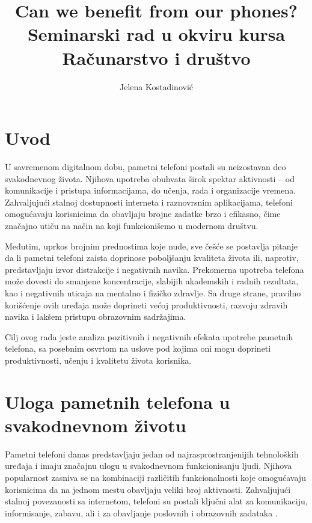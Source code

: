 \documentclass{article}
\title{Can we benefit from our phones? \\ 
\small{Seminarski rad u okviru kursa \\
Računarstvo i društvo}}
\author{Jelena Kostadinović }
\begin{document}
\sloppy
\maketitle

\renewcommand{\contentsname}{Sadržaj}

\tableofcontents

\newpage

\section{Uvod}

U savremenom digitalnom dobu, pametni telefoni postali su neizostavan deo svakodnevnog života. Njihova upotreba obuhvata širok spektar aktivnosti – od komunikacije i pristupa informacijama, do učenja, rada i organizacije vremena. Zahvaljujući stalnoj dostupnosti interneta i raznovrsnim aplikacijama, telefoni omogućavaju korisnicima da obavljaju brojne zadatke brzo i efikasno, čime značajno utiču na način na koji funkcionišemo u modernom društvu.

Međutim, uprkos brojnim prednostima koje nude, sve češće se postavlja pitanje da li pametni telefoni zaista doprinose poboljšanju kvaliteta života ili, naprotiv, predstavljaju izvor distrakcije i negativnih navika. Prekomerna upotreba telefona može dovesti do smanjene koncentracije, slabijih akademskih i radnih rezultata, kao i negativnih uticaja na mentalno i fizičko zdravlje. Sa druge strane, pravilno korišćenje ovih uređaja može doprineti većoj produktivnosti, razvoju zdravih navika i lakšem pristupu obrazovnim sadržajima.

Cilj ovog rada jeste analiza pozitivnih i negativnih efekata upotrebe pametnih telefona, sa posebnim osvrtom na uslove pod kojima oni mogu doprineti produktivnosti, učenju i kvalitetu života korisnika. 

\section{Uloga pametnih telefona u svakodnevnom životu}

Pametni telefoni danas predstavljaju jedan od najrasprostranjenijih tehnoloških uređaja i imaju značajnu ulogu u svakodnevnom funkcionisanju ljudi. Njihova popularnost zasniva se na kombinaciji različitih funkcionalnosti koje omogućavaju korisnicima da na jednom mestu obavljaju veliki broj aktivnosti. Zahvaljujući stalnoj povezanosti sa internetom, telefoni su postali ključni alat za komunikaciju, informisanje, zabavu, ali i za obavljanje poslovnih i obrazovnih zadataka \cite{Rainie2012}.
\end{document}
